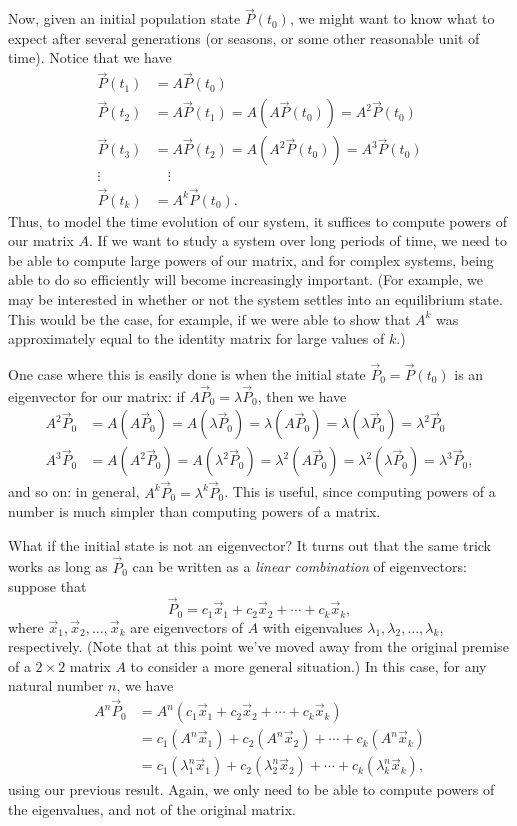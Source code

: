 \documentclass[12pt,letterpaper]{article}
\begin{document}
Now, given an initial population state $\vec{P}(t_0)$, we might want to know what to expect after several generations (or seasons, or some other reasonable unit of time). Notice that we have
\begin{align*}
 \vec{P}(t_1) & = A\vec{P}(t_0)\\
 \vec{P}(t_2) & = A\vec{P}(t_1) = A(A\vec{P}(t_0)) = A^2\vec{P}(t_0)\\
 \vec{P}(t_3) & = A\vec{P}(t_2) = A(A^2\vec{P}(t_0)) = A^3\vec{P}(t_0)\\
 \vdots \quad & \quad \vdots\\
 \vec{P}(t_k) & = A^k\vec{P}(t_0).
\end{align*}
Thus, to model the time evolution of our system, it suffices to compute powers of our matrix $A$. If we want to study a system over long periods of time, we need to be able to compute large powers of our matrix, and for complex systems, being able to do so efficiently will become increasingly important. (For example, we may be interested in whether or not the system settles into an equilibrium state. This would be the case, for example, if we were able to show that $A^k$ was approximately equal to the identity matrix for large values of $k$.)

One case where this is easily done is when the initial state $\vec{P}_0=\vec{P}(t_0)$ is an eigenvector for our matrix: if $A\vec{P}_0 = \lambda\vec{P}_0$, then we have
\begin{align*}
 A^2\vec{P}_0 &= A(A\vec{P}_0) = A(\lambda \vec{P}_0) = \lambda (A\vec{P}_0) = \lambda(\lambda \vec{P}_0) = \lambda^2\vec{P}_0\\
 A^3\vec{P}_0 &= A(A^2\vec{P}_0) = A(\lambda^2\vec{P}_0) = \lambda^2 (A\vec{P}_0) = \lambda^2(\lambda\vec{P}_0) = \lambda^3\vec{P}_0,
\end{align*}
and so on: in general, $A^k\vec{P}_0 = \lambda^k\vec{P}_0$. This is useful, since computing powers of a number is much simpler than computing powers of a matrix.

What if the initial state is not an eigenvector? It turns out that the same trick works as long as $\vec{P}_0$ can be written as a \textit{linear combination} of eigenvectors: suppose that
\[
 \vec{P}_0 = c_1\vec{x}_1 + c_2\vec{x}_2 + \cdots + c_k\vec{x}_k,
\]
where $\vec{x}_1, \vec{x}_2, \ldots, \vec{x}_k$ are eigenvectors of $A$ with eigenvalues $\lambda_1, \lambda_2, \ldots, \lambda_k$, respectively. (Note that at this point we've moved away from the original premise of a $2\times 2$ matrix $A$ to consider a more general situation.) In this case, for any natural number $n$, we have
\begin{align*}
 A^n\vec{P}_0 &= A^n(c_1\vec{x}_1 + c_2\vec{x}_2 + \cdots + c_k\vec{x}_k)\\
 & = c_1(A^n\vec{x}_1) + c_2(A^n\vec{x}_2) + \cdots + c_k(A^n\vec{x}_k)\\
 & = c_1(\lambda_1^n\vec{x}_1) + c_2(\lambda_2^n\vec{x}_2) + \cdots + c_k(\lambda_k^n\vec{x}_k),
\end{align*}
using our previous result. Again, we only need to be able to compute powers of the eigenvalues, and not of the original matrix.
\end{document}
